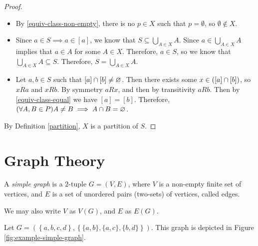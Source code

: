 \begin{proof}\proofbreak
    \begin{itemize}
        \item By \ref{equiv-class-non-empty}, there is no $p \in X$ such that $p = \emptyset$, so $\emptyset \notin X$.
        \item Since $a \in S \implies a \in \left[a\right]$, we know that $S \subseteq \bigcup_{A\in X}A$. Since $a \in \bigcup_{A\in X}A$ implies that $a \in A$ for some $A \in X$. Therefore, $a \in S$, so we know that $\bigcup_{A\in X}A \subseteq S$. Therefore, $S = \bigcup_{A\in X}A$.
        \item Let $a, b \in S$ such that $\left[a\right] \cap \left[b\right] \neq \varnothing$. Then there exists some $x \in (\left[a\right] \cap \left[b\right])$, so $x R a$ and $x R b$. By symmetry $a R x$, and then by transitivity $a R b$. Then by \ref{equiv-class-equal} we have $\left[a\right] = \left[b\right]$. Therefore, $(\forall A, B \in P) A \neq B \implies A \cap B = \varnothing$.
    \end{itemize}
    By Definition \ref{partition}, $X$ is a partition of $S$.
\end{proof}

\section{Graph Theory}

\begin{defn}
    A \emph{simple graph} is a $2$-tuple $G = (V, E)$, where $V$ is a non-empty finite set of vertices, and $E$ is a set of unordered pairs (two-sets) of vertices, called edges.
\end{defn}

\begin{rmk}
    We may also write $V$ as $V(G)$, and $E$ as $E(G)$.
\end{rmk}

\begin{exmp} Let $G = \left(\left\{a, b, c, d\right\}, \left\{\{a, b\}, \{a, c\}, \{b, d\}\right\}\right)$. This graph is depicted in Figure \ref{fig:example-simple-graph}.
\end{exmp}

